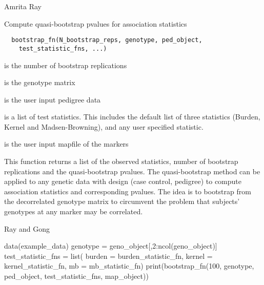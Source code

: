 \documentclass[a4paper]{book}
\begin{document}
%
\begin{Author}\relax
Amrita Ray 
\end{Author}
%
\begin{Description}\relax
Compute quasi-bootstrap pvalues for association
statistics
\end{Description}
%
\begin{Usage}
\begin{verbatim}
  bootstrap_fn(N_bootstrap_reps, genotype, ped_object,
    test_statistic_fns, ...)
\end{verbatim}
\end{Usage}
%
\begin{Arguments}
\begin{ldescription}
\item[\code{N\_bootstrap\_reps}] is the number of bootstrap
replications

\item[\code{genotype}] is the genotype matrix

\item[\code{ped\_object}] is the user input pedigree data

\item[\code{test\_statistic\_fns}] is a list of test statistics.
This includes the default list of three statistics
(Burden, Kernel and Madsen-Browning), and any user
specified statistic.

\item[\code{map\_object}] is the user input mapfile of the
markers
\end{ldescription}
\end{Arguments}
%
\begin{Details}\relax
This function returns a list of the observed statistics,
number of bootstrap replications and the quasi-bootstrap
pvalues. The quasi-bootstrap method can be applied to any
genetic data with design (case control, pedigree) to
compute association statistics and corresponding pvalues.
The idea is to bootstrap from the decorrelated genotype
matrix to circumvent the problem that subjects' genotypes
at any marker may be correlated.
\end{Details}
%
\begin{Author}\relax
Ray and Gong
\end{Author}
%
\begin{Examples}
\begin{ExampleCode}
data(example_data)
 genotype = geno_object[,2:ncol(geno_object)]
 test_statistic_fns = list(
     burden = burden_statistic_fn,
     kernel = kernel_statistic_fn,
     mb = mb_statistic_fn)
 print(bootstrap_fn(100, genotype, ped_object, test_statistic_fns, map_object))
\end{ExampleCode}
\end{Examples}
\end{document}
